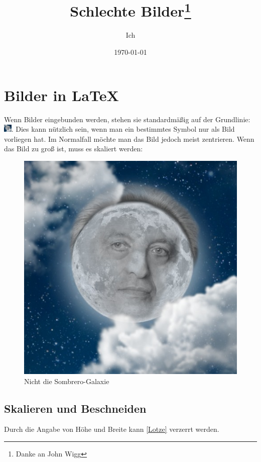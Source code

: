\documentclass[a4paper, 10pt,onecolumn]{scrartcl}
\title{Schlechte Bilder\thanks{Danke an John Wigg}}
\author{Ich} %
\date{\today}
\begin{document}
\tableofcontents
\listoffigures
\maketitle

\section{Bilder in \LaTeX}
Wenn Bilder eingebunden werden, stehen sie standardmäßig auf der Grundlinie: \includegraphics[width=11pt]{lotze.jpg}.
Dies kann nützlich sein, wenn man ein bestimmtes Symbol nur als Bild vorliegen hat. Im Normalfall möchte man das Bild jedoch meist zentrieren. Wenn das Bild zu groß ist, muss es skaliert werden:

\begin{figure}[ht!]
	\centering
	\includegraphics[scale=0.5]{lotze.jpg}
	\caption{Nicht die Sombrero-Galaxie}
	\label{Lotze}
\end{figure}
\newpage

\subsection{Skalieren und Beschneiden}
Durch die Angabe von Höhe und Breite kann \eqref{Lotze} verzerrt werden.
\end{document}
